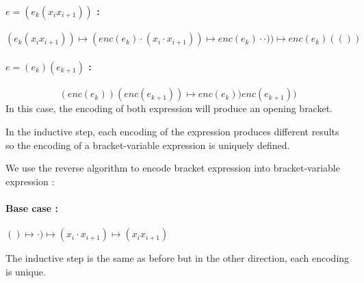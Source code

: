 \documentclass[a4paper,11pt]{report}
\begin{document}
\paragraph{$e = (e_k(x_ix_{i+1}))$ :}
\[
  (e_k(x_ix_{i+1})) \mapsto (enc(e_k) \cdot (x_i \cdot x_{i+1})) \mapsto
  enc(e_k) \cdot  \cdot )) \mapsto enc(e_k)(())
\]

\paragraph{$e = (e_k)(e_{k+1})$ :}
\[
  (enc(e_k))(enc(e_{k+1})) \mapsto enc(e_k))enc(e_{k+1}))
\]
In this case, the encoding of both expression will produce an opening bracket.

In the inductive step, each encoding of the expression produces different
results so the encoding of a bracket-variable expression is uniquely defined.

We use the reverse algorithm to encode bracket expression into bracket-variable
expression :

\paragraph{Base case :} $() \mapsto \cdot ) \mapsto (x_i \cdot x_{i+1}) \mapsto
(x_ix_{i+1})$

The inductive step is the same as before but in the other direction, each
encoding is unique.
\end{document}

